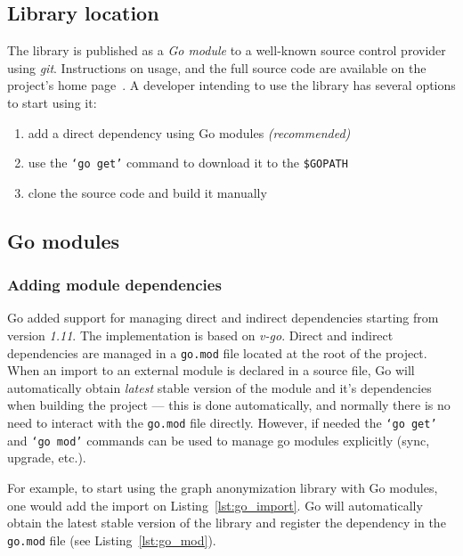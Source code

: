 \subsection{Library location}
The library is published as a \emph{Go module} to a well-known source control provider using \emph{git}. Instructions on usage, and the full source code are available on the project's home page~\cite{k-anon}. A developer intending to use the library has several options to start using it:
\begin{enumerate}
    \item add a direct dependency using Go modules \emph{(recommended)}
    \item use the \texttt{`go get'} command to download it to the \texttt{\$GOPATH}
    \item clone the source code and build it manually
\end{enumerate}

\subsection{Go modules}

\subsubsection{Adding module dependencies}

Go added support for managing direct and indirect dependencies starting from version \textit{1.11}. The implementation is based on \textit{v-go}. Direct and indirect dependencies are managed in a \texttt{go.mod} file located at the root of the project. When an import to an external module is declared in a source file, Go will automatically obtain \emph{latest} stable version of the module and it's dependencies when building the project --- this is done automatically, and normally there is no need to interact with the \texttt{go.mod} file directly. However, if needed the \texttt{`go get'} and \texttt{`go mod'} commands can be used to manage go modules explicitly (sync, upgrade, etc.).

For example, to start using the graph anonymization library with Go modules, one would add the import on Listing~\ref{lst:go_import}. Go will automatically obtain the latest stable version of the library and register the dependency in the \texttt{go.mod} file (see Listing~\ref{lst:go_mod}).



